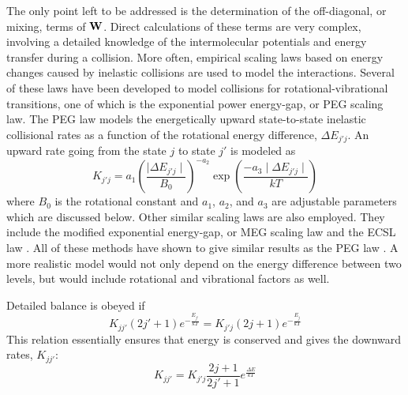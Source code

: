 \documentclass[11pt]{article}
\begin{document}
The only point left to be addressed is the determination of the 
off-diagonal,
or mixing, terms of ${\bf W}$.  Direct calculations of these terms are very
complex, involving a detailed knowledge of the intermolecular potentials 
and energy transfer during a collision.  More often, empirical scaling laws 
based on energy changes caused by inelastic collisions are used to model
the interactions.  Several of these laws have been developed
to model collisions for rotational-vibrational transitions, one of which is
the exponential power energy-gap, or PEG scaling law. The PEG law models the
energetically upward state-to-state inelastic collisional rates as a 
function of the rotational energy difference, $\Delta E_{j'j}$.  An upward 
rate going from the state $j$ to state $j'$ is modeled as 
\begin{equation}
 K_{j'j}=a_{1}\left(\frac{\mid\Delta E_{j'j}\mid}{B_{0}}\right)^{-a_{2}}
\exp\left(\frac{-a_{3}\mid\Delta E_{j'j}\mid}{kT}\right)
\label{eqn:krates}
\end{equation}
where $B_{0}$ is the rotational constant and $a_{1}$, $a_{2}$, and $a_{3}$
are adjustable parameters which are discussed below.  Other similar scaling 
laws are
also employed.  They include the modified exponential energy-gap, or MEG
scaling law and the ECSL law \cite{bru:82,ste:86}.  All of these
methods have shown to give similar results as the PEG law \cite{mac:92}.
A more realistic model would not only depend on the energy difference
between two levels, but would include rotational and vibrational factors 
as well.

Detailed balance is obeyed if
\begin{equation}
K_{jj'}(2j'+1)e^{-\frac{E_{j'}}{kT}}=K_{j'j}(2j+1)e^{-\frac{E_{j}}{kT}}
\end{equation}
This relation essentially ensures that energy is conserved and gives the
downward rates, $K_{jj'}$:
\begin{equation} 
K_{jj'}=K_{j'j} \frac{2j+1}{2j'+1} e^{\frac{\Delta E}{kT}}
\end{equation}
\end{document}
